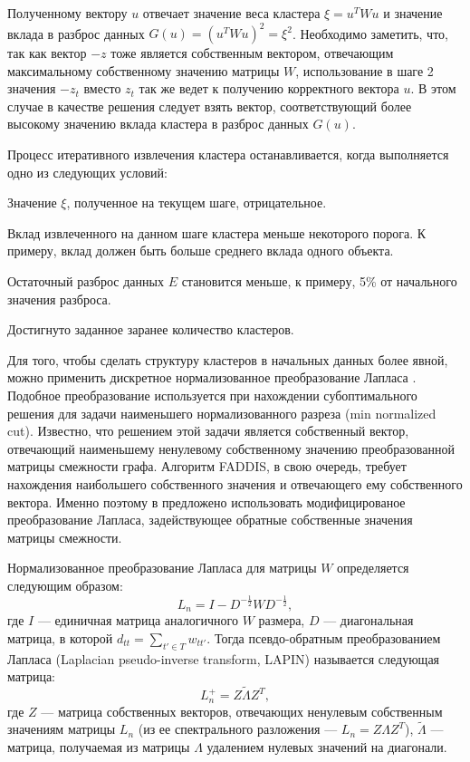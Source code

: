 \documentclass[12pt]{article}
\newenvironment{enumerate*}%
{\begin{enumerate}%
	\setlength{\itemsep}{0pt}%
	\setlength{\parskip}{0pt}}%
{\end{enumerate}}
\begin{document}
Полученному вектору $u$ отвечает значение веса кластера $\xi=u^TWu$ и значение вклада в разброс данных $G(u)=(u^TWu)^2=\xi^2$. Необходимо заметить, что, так как вектор $-z$ тоже является собственным вектором, отвечающим максимальному собственному значению матрицы $W$, использование в шаге 2 значения $-z_t$ вместо $z_t$ так же ведет к получению корректного вектора $u$. В этом случае в качестве решения следует взять вектор, соответствующий более высокому значению вклада кластера в разброс данных $G(u)$.

Процесс итеративного извлечения кластера останавливается, когда выполняется одно из следующих условий:
\begin{enumerate*}
	\item Значение $\xi$, полученное на текущем шаге, отрицательное.
	\item Вклад извлеченного на данном шаге кластера меньше некоторого порога. К примеру, вклад должен быть больше среднего вклада одного объекта.
	\item Остаточный разброс данных $E$ становится меньше, к примеру, 5\% от начального значения разброса.
	\item Достигнуто заданное заранее количество кластеров.
\end{enumerate*}

Для того, чтобы сделать структуру кластеров в начальных данных более явной, можно применить дискретное нормализованное преобразование Лапласа \cite{von2007tutorial}. Подобное преобразование используется при нахождении субоптимального решения для задачи наименьшего нормализованного разреза (min normalized cut). Известно, что решением этой задачи является собственный вектор, отвечающий наименьшему ненулевому собственному значению преобразованной матрицы смежности графа. Алгоритм FADDIS, в свою очередь, требует нахождения наибольшего собственного значения и отвечающего ему собственного вектора. Именно поэтому в \cite{mirkin2012additive} предложено использовать модифицированое преобразование Лапласа, задействующее обратные собственные значения матрицы смежности. 

Нормализованное преобразование Лапласа для матрицы $W$ определяется следующим образом:
\begin{equation}
	L_n=I-D^{-\frac{1}{2}}WD^{-\frac{1}{2}}, 
\end{equation}
где $I$ --- единичная матрица аналогичного $W$ размера, $D$ --- диагональная матрица, в которой $d_{tt} =\sum_{t'\in T} w_{tt'}$. 
Тогда псевдо-обратным преобразованием Лапласа (Laplacian pseudo-inverse transform, LAPIN) называется следующая матрица:
\begin{equation}
	L_n^+ = Z \tilde{\Lambda} Z^T,
\end{equation}
где $Z$ --- матрица собственных векторов, отвечающих ненулевым собственным значениям матрицы $L_n$ (из ее спектрального разложения --- $L_n=Z\Lambda Z^T$), $\tilde{\Lambda}$ --- матрица, получаемая из матрицы $\Lambda$ удалением нулевых значений на диагонали.
\end{document}
